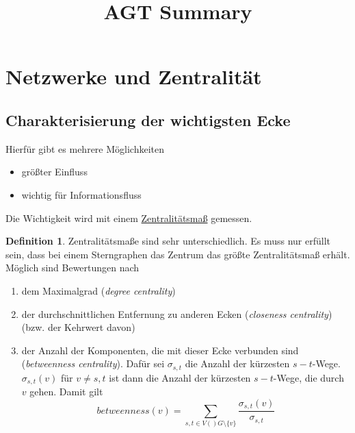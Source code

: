 \documentclass[a4paper, 12pt]{article}
\theoremstyle{plain}
\theoremstyle{definition}
\newtheorem{definition}[theorem]{Definition} %
\theoremstyle{lemma}
\theoremstyle{remark}
\theoremstyle{corollary}
\theoremstyle{example}
\begin{document}
	\begin{titlepage} 
		\title{AGT Summary}
		\clearpage\maketitle
		\thispagestyle{empty}
	\end{titlepage}
	\tableofcontents
	\newpage
	\section{Netzwerke und Zentralität}
	\subsection{Charakterisierung der wichtigsten Ecke}
	Hierfür gibt es mehrere Möglichkeiten
	\begin{itemize}
		\item größter Einfluss
		\item wichtig für Informationsfluss
	\end{itemize}
	Die Wichtigkeit wird mit einem \underline{Zentralitätsmaß} gemessen.
	\begin{definition}
		Zentralitätsmaße sind sehr unterschiedlich. Es muss nur erfüllt sein, dass bei einem Sterngraphen das Zentrum das größte Zentralitätsmaß erhält. Möglich sind Bewertungen nach
		\begin{enumerate}
			\item dem Maximalgrad (\textit{degree centrality})
			\item der durchschnittlichen Entfernung zu anderen Ecken (\textit{closeness centrality}) (bzw. der Kehrwert davon)
			\item der Anzahl der Komponenten, die mit dieser Ecke verbunden sind (\textit{betweenness centrality}). Dafür sei $\sigma_{s,t}$ die Anzahl der kürzesten $s-t$-Wege. $\sigma_{s,t}(v)$ für $v\neq s,t$ ist dann die Anzahl der kürzesten $s-t$-Wege, die durch $v$ gehen. Damit gilt \[betweenness(v) = \sum_{s,t \in V()G\setminus\{v\}} \frac{\sigma_{s,t}(v)}{\sigma_{s,t}}\]
		\end{enumerate}
	\end{definition}
\end{document}
